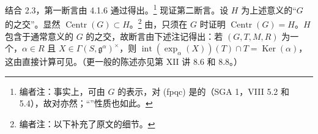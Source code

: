 结合 2.3，第一断言由 4.1.6 通过得出。\footnote{编者注：事实上，可由 $G$ 的表示，对 (fpqc) 是的（SGA 1，VIII 5.2 和 5.4），故对亦然；“”性质也如此。} 现证第二断言。设 $H$ 为上述意义的“$G$ 的之交”。显然 $\operatorname{Centr}(G)\subset H$。\footnote{编者注：以下补充了原文的细节。} 由，只须在 $G$ 时证明 $\operatorname{Centr}(G)=H$。$H$ 包含于通常意义的 $G$ 的之交，故断言由下述注记得出：若 $(G,T,M,R)$ 为一个，$\alpha\in R$ 且 $X\in\Gamma(S,\mathfrak g^\alpha)^\times$，则 $\operatorname{int}(\exp_\alpha(X))(T)\cap T=\operatorname{Ker}(\alpha)$，这由直接计算可见。（更一般的陈述亦见第 XII 讲 8.6 和 8.8。）

